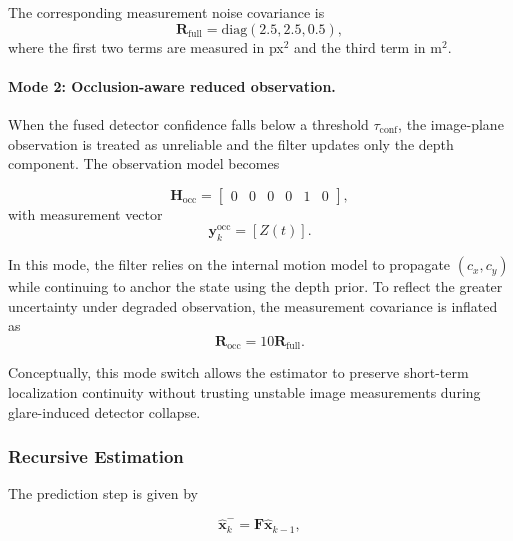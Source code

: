 \documentclass[pdflatex,sn-mathphys-num]{sn-jnl}%
\theoremstyle{thmstyleone}%
\theoremstyle{thmstyletwo}%
\theoremstyle{thmstylethree}%
\begin{document}
The corresponding measurement noise covariance is
\begin{equation}
\mathbf{R}_{\mathrm{full}} = \mathrm{diag}(2.5, 2.5, 0.5),
\label{eq:R_full}
\end{equation}
where the first two terms are measured in px$^2$ and the third term in m$^2$.

\paragraph{Mode 2: Occlusion-aware reduced observation.}
When the fused detector confidence falls below a threshold $\tau_{\mathrm{conf}}$, the image-plane observation is treated as unreliable and the filter updates only the depth component. The observation model becomes

\begin{equation}
\mathbf{H}_{\mathrm{occ}} =
\begin{bmatrix}
0 & 0 & 0 & 0 & 1 & 0
\end{bmatrix},
\label{eq:H_occ}
\end{equation}
with measurement vector
\begin{equation}
\mathbf{y}_k^{\mathrm{occ}} = [Z(t)].
\label{eq:y_occ}
\end{equation}

In this mode, the filter relies on the internal motion model to propagate $(c_x, c_y)$ while continuing to anchor the state using the depth prior. To reflect the greater uncertainty under degraded observation, the measurement covariance is inflated as
\begin{equation}
\mathbf{R}_{\mathrm{occ}} = 10 \mathbf{R}_{\mathrm{full}}.
\label{eq:R_occ}
\end{equation}

Conceptually, this mode switch allows the estimator to preserve short-term localization continuity without trusting unstable image measurements during glare-induced detector collapse.

\subsubsection{Recursive Estimation}

The prediction step is given by

\begin{equation}
\hat{\mathbf{x}}_{k}^{-} = \mathbf{F}\hat{\mathbf{x}}_{k-1},
\label{eq:kf_pred_x}
\end{equation}
\end{document}
